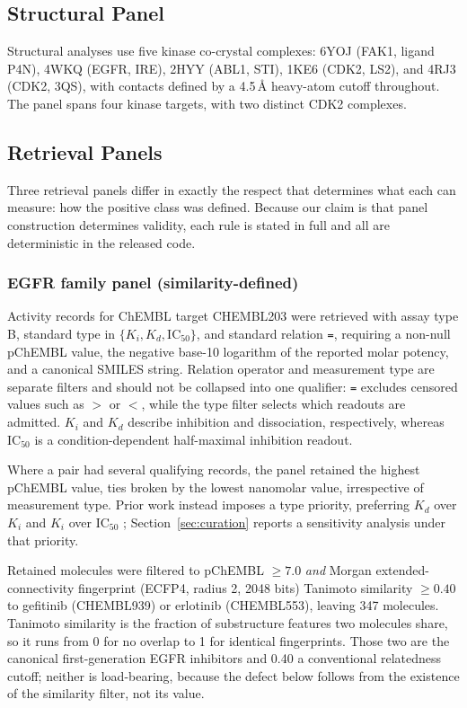 \documentclass{ieeeaccess}
\begin{document}
\subsection{Structural Panel}
Structural analyses use five kinase co-crystal complexes: 6YOJ (FAK1, ligand
P4N), 4WKQ (EGFR, IRE), 2HYY (ABL1, STI), 1KE6 (CDK2, LS2), and 4RJ3 (CDK2,
3QS), with contacts defined by a 4.5\,\AA{} heavy-atom cutoff throughout.
The panel spans four kinase targets, with two distinct CDK2 complexes.

\subsection{Retrieval Panels}
\label{sec:panels}
Three retrieval panels differ in exactly the respect that determines what each
can measure: how the positive class was defined. Because our claim is that panel
construction determines validity, each rule is stated in full and all are
deterministic in the released code.

\subsubsection{EGFR family panel (similarity-defined)}
Activity records for ChEMBL target CHEMBL203 were retrieved with assay type B,
standard type in $\{K_i, K_d, \mathrm{IC}_{50}\}$, and standard relation
\texttt{=}, requiring a non-null pChEMBL value, the negative base-10 logarithm
of the reported molar potency, and a canonical SMILES string. Relation
operator and measurement type are separate filters and should not be collapsed
into one qualifier: \texttt{=} excludes censored values such as $>$ or $<$,
while the type filter selects which readouts are admitted. $K_i$ and $K_d$
describe inhibition and dissociation, respectively, whereas IC$_{50}$ is a
condition-dependent half-maximal inhibition readout.

Where a pair had several qualifying records, the panel retained the highest
pChEMBL value, ties broken by the lowest nanomolar value, irrespective of
measurement type. Prior work instead imposes a type priority, preferring $K_d$
over $K_i$ and $K_i$ over IC$_{50}$ \cite{valsson2025augmented};
Section~\ref{sec:curation} reports a sensitivity analysis under that priority.

Retained molecules were filtered to pChEMBL $\geq 7.0$ \emph{and} Morgan
extended-connectivity fingerprint (ECFP4, radius 2, 2048 bits)
\cite{rogers2010ecfp} Tanimoto
similarity $\geq 0.40$ to gefitinib (CHEMBL939) or erlotinib (CHEMBL553),
leaving 347 molecules. Tanimoto similarity is the fraction of substructure
features two molecules share, so it runs from 0 for no overlap to 1 for
identical fingerprints. Those two
are the canonical first-generation EGFR inhibitors and 0.40 a conventional
relatedness cutoff; neither is load-bearing, because the defect below follows
from the existence of the similarity filter, not its value.
\end{document}
